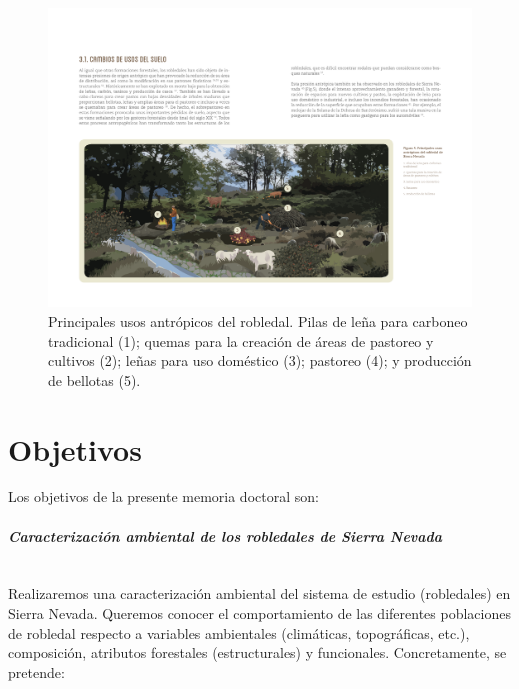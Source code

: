 \begin{figure}
	\centering
	\includegraphics[width=\textwidth]{img/intro/intro-usos.pdf} \caption{Principales usos antrópicos del robledal. Pilas de leña para carboneo tradicional (1); quemas para la creación de áreas de pastoreo y cultivos (2); leñas para uso doméstico (3); pastoreo (4); y producción de bellotas (5).}\label{fig:intro:usos}
\end{figure}

\section{Objetivos}

Los objetivos de la presente memoria doctoral son: 

\paragraph{\emph{Caracterización ambiental de los robledales de Sierra Nevada}} \mbox{} \\
Realizaremos una caracterización ambiental del sistema de estudio (robledales) en Sierra Nevada. Queremos conocer el comportamiento de las diferentes poblaciones de robledal respecto a variables ambientales (climáticas, topográficas, etc.), composición, atributos forestales (estructurales) y funcionales. Concretamente, se pretende:

